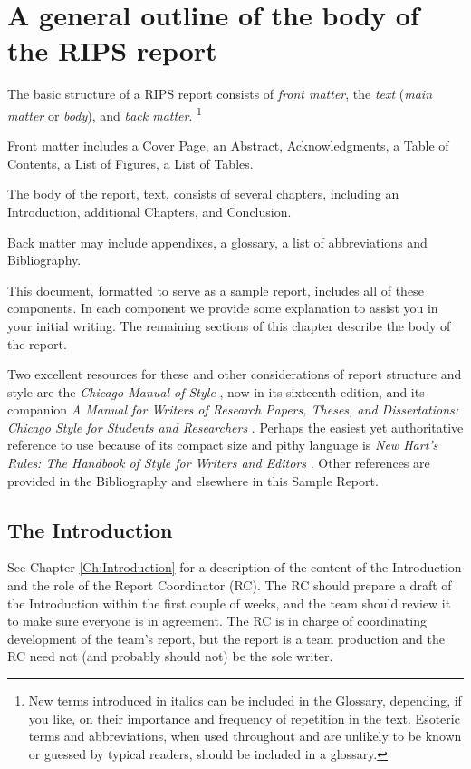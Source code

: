 \chapter{A general outline of the body of the RIPS report}\label{Ch:GeneralOutline}

The basic structure of a RIPS report consists of \emph{front matter}, the \emph{text} (\emph{main matter} or \emph{body}), and \emph{back matter}.%
\footnote{
New terms introduced in italics can be included in the Glossary, depending, if you like, on their importance and frequency of repetition in the text.
Esoteric terms and abbreviations, when used throughout and are unlikely to be known or guessed by typical readers, should be included in a glossary.
}

Front matter includes a Cover Page, an Abstract, Acknowledgments, a Table of
Contents, a List of Figures, a List of Tables.

The body of the report, text, consists of several chapters, including an Introduction, additional Chapters, and Conclusion.

Back matter may include appendixes, a glossary, a list of abbreviations and Bibliography.

This document, formatted to serve as a sample report, includes all of these components. In each component we provide some explanation to assist you in your initial writing. 
The remaining sections of this chapter describe the body of the report.

Two excellent resources for these and other considerations of report structure and style are the \emph{Chicago Manual of Style} \cite{Chicago-Manual}, now in its sixteenth edition, and its companion \emph{A Manual for Writers of Research Papers, Theses, and Dissertations: Chicago Style for Students and Researchers} \cite{Turabian}.
Perhaps the easiest yet authoritative reference to use because of its compact size and pithy language is \emph{New Hart's Rules: The Handbook of Style for Writers and Editors} \cite{NewHartRules}.
Other references are provided in the Bibliography and elsewhere in this Sample Report.

\section{The Introduction}

See Chapter \ref{Ch:Introduction} for a description of the content of the Introduction and the role of the Report Coordinator (RC).
The RC should prepare a draft of the Introduction within the first couple of weeks, and the team should review it to make sure everyone is in agreement.
The RC is in charge of coordinating development of the team's report, but the report is a team production and the RC need not (and probably should not) be the sole writer.

